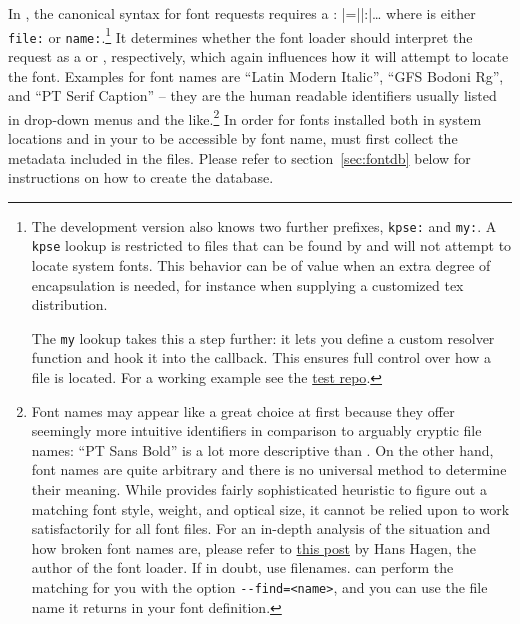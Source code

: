In , the canonical syntax for font requests
requires a :
%
\beginnarrower
  |\font\fontname=||:|\dots
\endnarrower
%
where  is either \verb|file:| or \verb|name:|.\footnote{%
  The development version also knows two further prefixes,
  \verb|kpse:| and \verb|my:|.
  A \verb|kpse| lookup is restricted to files that can be found by
   and
  will not attempt to locate system fonts.
  This behavior can be of value when an extra degree of encapsulation is
  needed, for instance when supplying a customized tex distribution.

  The \verb|my| lookup takes this a step further: it lets you define
  a custom resolver function and hook it into the 
  callback.
  This ensures full control over how a file is located.
  For a working example see the
  \href{https://bitbucket.org/phg/lua-la-tex-tests/src/5f6a535d/pln-lookup-callback-1.tex}
       {test repo}.
}
%
It determines whether the font loader should interpret the request as
a  or
  , respectively,
which again influences how it will attempt to locate the font.
%
Examples for font names are
            “Latin Modern Italic”,
            “GFS Bodoni Rg”, and
            “PT Serif Caption”
-- they are the human readable identifiers
usually listed in drop-down menus and the like.\footnote{%
  Font names may appear like a great choice at first because they
  offer seemingly more intuitive identifiers in comparison to arguably
  cryptic file names:
  “PT Sans Bold” is a lot more descriptive than .
  On the other hand, font names are quite arbitrary and there is no
  universal method to determine their meaning.
  While  provides fairly sophisticated heuristic
  to figure out a matching font style, weight, and optical size, it
  cannot be relied upon to work satisfactorily for all font files.
  For an in-depth analysis of the situation and how broken font names
  are, please refer to
  \href{http://www.ntg.nl/pipermail/ntg-context/2013/073889.html}
       {this post}
  by Hans Hagen, the author of the font loader.
  If in doubt, use filenames.
   can perform the matching for you with the
  option \verb|--find=<name>|, and you can use the file name it returns
  in your font definition.
}
%
In order for fonts installed both in system locations and in your
 to be accessible by font name,  must
first collect the metadata included in the files.
%
Please refer to section~\ref{sec:fontdb} below for instructions on how to
create the database.

